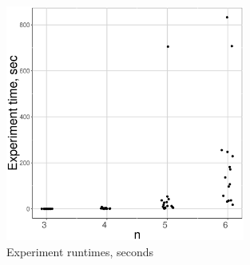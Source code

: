 \documentclass[11pt]{article}
\begin{document}
\begin{figure}
\center
\includegraphics[width=0.7\textwidth]{runtimes.eps}
\caption{Experiment runtimes, seconds}
\label{fig:runtimes}
\end{figure}
\end{document}
